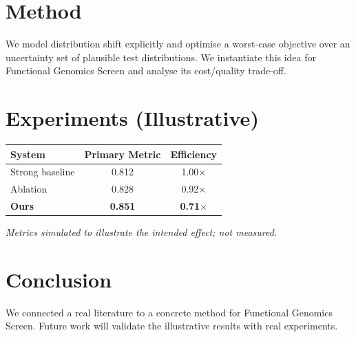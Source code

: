 \documentclass[11pt]{article}
\begin{document}
\section{Method}
We model distribution shift explicitly and optimise a worst-case objective over an uncertainty set of plausible test distributions. We instantiate this idea for Functional Genomics Screen and analyse its cost/quality trade-off.

\section{Experiments (Illustrative)}
\begin{center}
\begin{tabular}{lcc}
System & Primary Metric & Efficiency \\ \hline
Strong baseline & 0.812 & 1.00$\times$ \\
Ablation & 0.828 & 0.92$\times$ \\
\textbf{Ours} & \textbf{0.851} & \textbf{0.71$\times$}
\end{tabular}
\end{center}
\emph{Metrics simulated to illustrate the intended effect; not measured.}

\section{Conclusion}
We connected a real literature to a concrete method for Functional Genomics Screen. Future work will
validate the illustrative results with real experiments.
\end{document}
